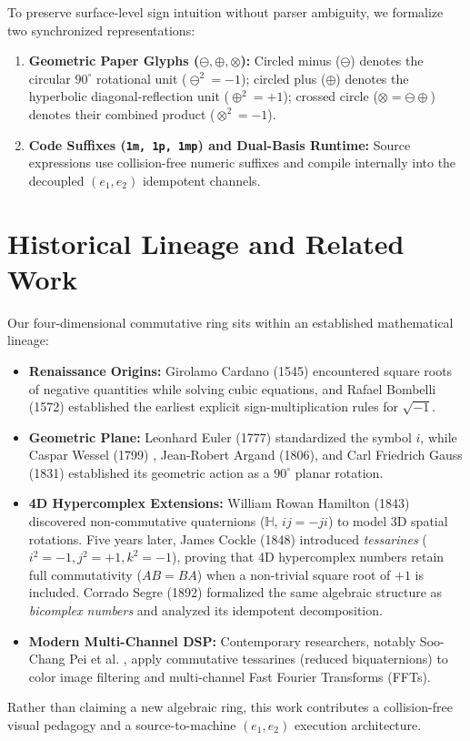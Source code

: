 \documentclass[11pt,a4paper]{article}
\begin{document}
To preserve surface-level sign intuition without parser ambiguity, we formalize two synchronized representations:
\begin{enumerate}
    \item \textbf{Geometric Paper Glyphs ($\ominus, \oplus, \otimes$):} Circled minus ($\ominus$) denotes the circular $90^\circ$ rotational unit ($\ominus^2 = -1$); circled plus ($\oplus$) denotes the hyperbolic diagonal-reflection unit ($\oplus^2 = +1$); crossed circle ($\otimes = \ominus\oplus$) denotes their combined product ($\otimes^2 = -1$).
    \item \textbf{Code Suffixes (\texttt{1m, 1p, 1mp}) and Dual-Basis Runtime:} Source expressions use collision-free numeric suffixes and compile internally into the decoupled $(e_1, e_2)$ idempotent channels.
\end{enumerate}

\section{Historical Lineage and Related Work}
Our four-dimensional commutative ring sits within an established mathematical lineage:
\begin{itemize}
    \item \textbf{Renaissance Origins:} Girolamo Cardano (1545) \cite{cardano1545} encountered square roots of negative quantities while solving cubic equations, and Rafael Bombelli (1572) \cite{bombelli1572} established the earliest explicit sign-multiplication rules for $\sqrt{-1}$.
    \item \textbf{Geometric Plane:} Leonhard Euler (1777) \cite{euler1777} standardized the symbol $i$, while Caspar Wessel (1799) \cite{wessel1799}, Jean-Robert Argand (1806), and Carl Friedrich Gauss (1831) \cite{gauss1831} established its geometric action as a $90^\circ$ planar rotation.
    \item \textbf{4D Hypercomplex Extensions:} William Rowan Hamilton (1843) \cite{hamilton1843} discovered non-commutative quaternions ($\mathbb{H}$, $ij = -ji$) to model 3D spatial rotations. Five years later, James Cockle (1848) \cite{cockle1848} introduced \emph{tessarines} ($i^2 = -1, j^2 = +1, k^2 = -1$), proving that 4D hypercomplex numbers retain full commutativity ($AB = BA$) when a non-trivial square root of $+1$ is included. Corrado Segre (1892) \cite{segre1892} formalized the same algebraic structure as \emph{bicomplex numbers} and analyzed its idempotent decomposition.
    \item \textbf{Modern Multi-Channel DSP:} Contemporary researchers, notably Soo-Chang Pei et al. \cite{pei2004}, apply commutative tessarines (reduced biquaternions) to color image filtering and multi-channel Fast Fourier Transforms (FFTs).
\end{itemize}
Rather than claiming a new algebraic ring, this work contributes a collision-free visual pedagogy and a source-to-machine $(e_1, e_2)$ execution architecture.
\end{document}
